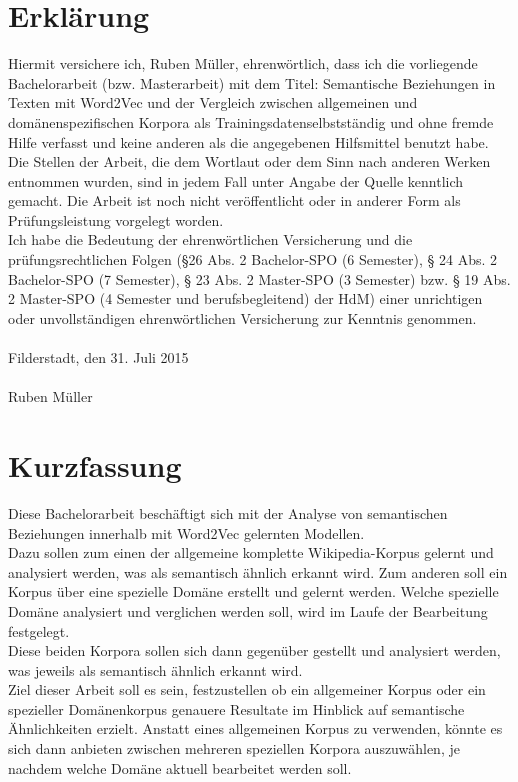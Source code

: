 \documentclass[12pt,a4paper]{report}
\begin{document}
\newpage
\chapter*{Erklärung}
Hiermit versichere ich, Ruben Müller, ehrenwörtlich, dass ich die 
vorliegende Bachelorarbeit (bzw. Masterarbeit) mit dem Titel: \glqq Semantische Beziehungen in Texten mit Word2Vec und der Vergleich zwischen allgemeinen und domänenspezifischen Korpora als Trainingsdaten\grqq selbstständig und ohne fremde Hilfe verfasst und keine anderen als die angegebenen Hilfsmittel benutzt habe. Die Stellen der Arbeit, die dem Wortlaut oder dem Sinn nach anderen Werken entnommen wurden, sind in jedem Fall unter Angabe der Quelle kenntlich gemacht. Die Arbeit ist noch nicht veröffentlicht oder in anderer Form als Prüfungsleistung vorgelegt worden.\\
Ich habe die Bedeutung der ehrenwörtlichen Versicherung und die prüfungsrechtlichen Folgen (§26 Abs. 2 Bachelor-SPO (6 Semester), § 24 Abs. 2 Bachelor-SPO (7 Semester), § 23 Abs. 2 Master-SPO (3 Semester)  bzw. § 19 Abs. 2 Master-SPO (4 Semester und 
berufsbegleitend) der HdM) einer unrichtigen oder unvollständigen ehrenwörtlichen
Versicherung zur Kenntnis genommen.\\
\vspace{1em}\\
Filderstadt, den 31. Juli 2015\\
\vspace{5em}\\
Ruben Müller


\newpage
\chapter*{Kurzfassung}
Diese Bachelorarbeit beschäftigt sich mit der Analyse von semantischen Beziehungen innerhalb mit Word2Vec gelernten Modellen.
\\Dazu sollen zum einen der allgemeine komplette Wikipedia-Korpus gelernt und analysiert werden, was als semantisch ähnlich erkannt wird. Zum anderen soll ein Korpus über eine spezielle Domäne erstellt und gelernt werden. Welche spezielle Domäne analysiert und verglichen werden soll, wird im Laufe der Bearbeitung festgelegt.
\\Diese beiden Korpora sollen sich dann gegenüber gestellt und analysiert werden, was jeweils als semantisch ähnlich erkannt wird. 
\\Ziel dieser Arbeit soll es sein, festzustellen ob ein allgemeiner Korpus oder ein spezieller Domänenkorpus genauere Resultate im Hinblick auf semantische Ähnlichkeiten erzielt. Anstatt eines allgemeinen Korpus zu verwenden, könnte es sich dann anbieten zwischen mehreren speziellen Korpora auszuwählen, je nachdem welche Domäne aktuell bearbeitet werden soll.
\newpage
\end{document}
